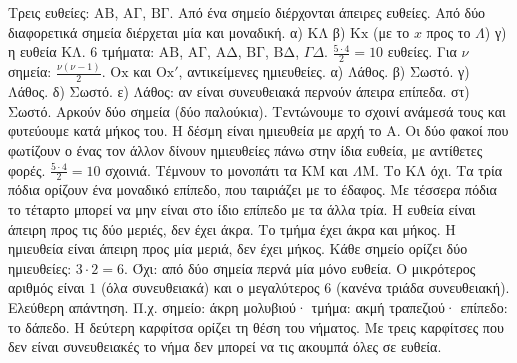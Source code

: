  Τρεις ευθείες: $\mathrm{ΑΒ}$, $\mathrm{ΑΓ}$, $\mathrm{ΒΓ}$.
 Από ένα σημείο διέρχονται άπειρες ευθείες. Από δύο διαφορετικά σημεία διέρχεται μία και μοναδική.
 α) $\mathrm{ΚΛ}$ \quad β) $\mathrm{Κx}$ (με το $x$ προς το $\Lambda$) \quad γ) η ευθεία $\mathrm{ΚΛ}$.
 $6$ τμήματα: $\mathrm{ΑΒ}$, $\mathrm{ΑΓ}$, $\mathrm{ΑΔ}$, $\mathrm{ΒΓ}$, $\mathrm{ΒΔ}$, $\Gamma\Delta$.
 $\frac{5\cdot4}{2}=10$ ευθείες. Για $\nu$ σημεία: $\frac{\nu(\nu-1)}{2}$.
 $\mathrm{Οx}$ και $\mathrm{Οx'}$, αντικείμενες ημιευθείες.
 α) Λάθος. β) Σωστό. γ) Λάθος. δ) Σωστό. ε) Λάθος: αν είναι συνευθειακά περνούν άπειρα επίπεδα. στ) Σωστό.
 Αρκούν δύο σημεία (δύο παλούκια). Τεντώνουμε το σχοινί ανάμεσά τους και φυτεύουμε κατά μήκος του.
 Η δέσμη είναι ημιευθεία με αρχή το $\mathrm{Α}$. Οι δύο φακοί που φωτίζουν ο ένας τον άλλον δίνουν ημιευθείες πάνω στην ίδια ευθεία, με αντίθετες φορές.
 $\frac{5\cdot4}{2}=10$ σχοινιά.
 Τέμνουν το μονοπάτι τα $\mathrm{ΚΜ}$ και $\Lambda\mathrm{Μ}$. Το $\mathrm{ΚΛ}$ όχι.
 Τα τρία πόδια ορίζουν ένα μοναδικό επίπεδο, που ταιριάζει με το έδαφος. Με τέσσερα πόδια το τέταρτο μπορεί να μην είναι στο ίδιο επίπεδο με τα άλλα τρία.
 Η ευθεία είναι άπειρη προς τις δύο μεριές, δεν έχει άκρα. Το τμήμα έχει άκρα και μήκος. Η ημιευθεία είναι άπειρη προς μία μεριά, δεν έχει μήκος.
 Κάθε σημείο ορίζει δύο ημιευθείες: $3\cdot2=6$.
 Όχι: από δύο σημεία περνά μία μόνο ευθεία.
 Ο μικρότερος αριθμός είναι $1$ (όλα συνευθειακά) και ο μεγαλύτερος $6$ (κανένα τριάδα συνευθειακή).
 Ελεύθερη απάντηση. Π.χ. σημείο: άκρη μολυβιού· τμήμα: ακμή τραπεζιού· επίπεδο: το δάπεδο.
 Η δεύτερη καρφίτσα ορίζει τη θέση του νήματος. Με τρεις καρφίτσες που δεν είναι συνευθειακές το νήμα δεν μπορεί να τις ακουμπά όλες σε ευθεία.
